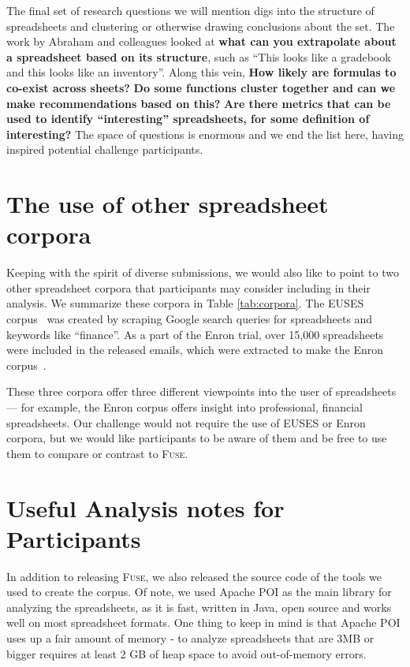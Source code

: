 \documentclass[conference]{IEEEtran}
\begin{document}
The final set of research questions we will mention digs into the structure of spreadsheets and clustering or otherwise drawing conclusions about the set.
The work by Abraham and colleagues \cite{Abraham2006} looked at \textbf{what can you extrapolate about a spreadsheet based on its structure}, such as ``This looks like a gradebook and this looks like an inventory''.
Along this vein, \textbf{How likely are formulas to co-exist across sheets?} 
\textbf{Do some functions cluster together and can we make recommendations based on this? }
\textbf{Are there metrics that can be used to identify ``interesting'' spreadsheets, for some definition of interesting?}
The space of questions is enormous and we end the list here, having inspired potential challenge participants.


\section{The use of other spreadsheet corpora}
Keeping with the spirit of diverse submissions, we would also like to point to two other spreadsheet corpora that participants may consider including in their analysis.
We summarize these corpora in Table \ref{tab:corpora}.
The EUSES corpus~\cite{Fisher2005} was created by scraping Google search queries for spreadsheets and keywords like ``finance''.
As a part of the Enron trial, over 15,000 spreadsheets were included in the released emails, which were extracted to make the Enron corpus~\cite{Hermans2015}.

These three corpora offer three different viewpoints into the user of spreadsheets --- for example, the Enron corpus offers insight into professional, financial spreadsheets.
Our challenge would not require the use of EUSES or Enron corpora, but we would like participants to be aware of them and be free to use them to compare or contrast to \textsc{Fuse}.



\section{Useful Analysis notes for Participants}

In addition to releasing \textsc{Fuse}, we also released the source code of the tools we used to create the corpus.
Of note, we used Apache POI as the main library for analyzing the spreadsheets, as it is fast, written in Java, open source and works well on most spreadsheet formats.
One thing to keep in mind is that Apache POI uses up a fair amount of memory - to analyze spreadsheets that are 3MB or bigger requires at least 2 GB of heap space to avoid out-of-memory  errors.
\end{document}
